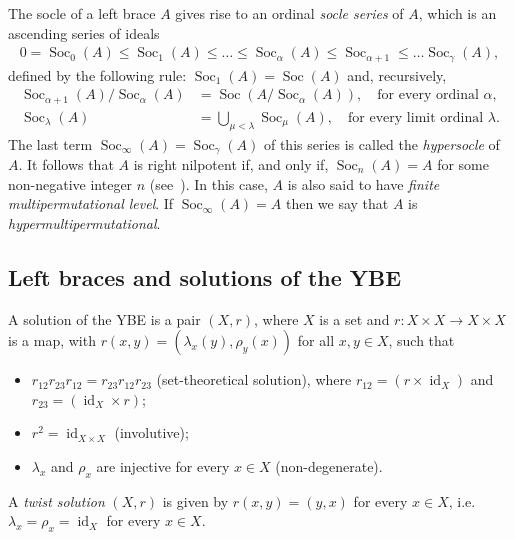 \documentclass[12pt, a4paper, english]{article}
\theoremstyle{definition}
\DeclareMathOperator{\Soc}{Soc}
\DeclareMathOperator{\id}{id}
\begin{document}
The socle of a left brace $A$ gives rise to an ordinal \emph{socle series} of $A$, which is an ascending series of ideals
\begin{align*}
 0 = \Soc_0(A) \leq \Soc_1(A) \leq \ldots \leq \Soc_{\alpha}(A) \leq \Soc_{\alpha +1} \leq \ldots \Soc_{\gamma}(A),
\end{align*}
defined by the following rule: $\Soc_1(A) = \Soc(A)$ and, recursively,
\begin{align*}
 \Soc_{\alpha+1}(A)/\Soc_{\alpha}(A) &= \Soc(A/\Soc_\alpha(A)),\quad \text{for every ordinal $\alpha$,}\\
 \Soc_{\lambda}(A) & = \bigcup_{\mu < \lambda} \Soc_{\mu}(A),\quad  \text{for every limit ordinal $\lambda$.}
\end{align*}
The last term $\Soc_\infty(A) = \Soc_\gamma(A)$ of this series is called the \emph{hypersocle} of~$A$. It follows that $A$ is right nilpotent if, and only if, $\Soc_n(A) = A$ for some non-negative integer $n$ (see~\cite{CedoSmoktunowiczVendramin19}). In this case, $A$ is also said to have \emph{finite multipermutational level}. If $\Soc_\infty(A) = A$ then we say that $A$ is \emph{hypermultipermutational}.

\subsection*{Left braces and solutions of the YBE}

\noindent A solution of the YBE is a pair $(X,r)$, where $X$ is  a set and $r\colon X \times X \rightarrow X \times X$ is a map, with $r(x,y) = (\lambda_x(y), \rho_y(x))$ for all $x,y\in X$, such that
\begin{itemize}
\item $r_{12}r_{23}r_{12} = r_{23}r_{12}r_{23}$ (set-theoretical solution), where $r_{12}= (r\times \id_X)$ and $r_{23} = (\id_X \times r)$;
\item $r^2 = \id_{X\times X}$ (involutive);
\item $\lambda_x$ and $\rho_x$ are injective for every $x\in X$ (non-degenerate).
\end{itemize} 
A \emph{twist solution} $(X,r)$ is given by $r(x,y) = (y,x)$ for every $x\in X$, i.e. $\lambda_x = \rho_x = \id_X$ for every $x\in X$. 
\end{document}
